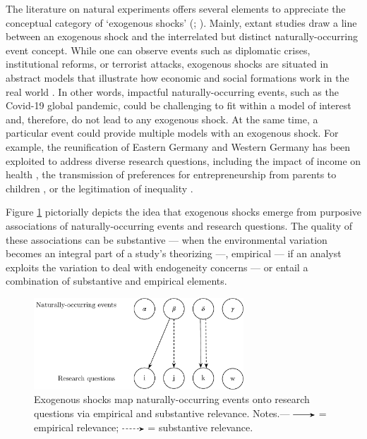 \begin{refsection}
\noindent The literature on natural experiments offers several elements to
appreciate the conceptual category of `exogenous shocks' (\cite[for an overview
of the natural experiment design, see for example][]{withers_li_2021,
dunning_2012,craig_et_al_2017,keele_et_al_2016}; \cite[for a review of the
application of this design, see][]{sekhon_titiunik_2012,sieweke_santoni_2020,
roseinzweig_et_al_2000}). Mainly, extant studies draw a line between an
exogenous shock and the interrelated but distinct naturally-occurring event
concept. While one can observe events such as diplomatic crises, institutional
reforms, or terrorist attacks, exogenous shocks are situated in abstract models
that illustrate how economic and social formations work in the real world
\autocite{morgan_2012}. In other words, impactful naturally-occurring events,
such as the Covid-19 global pandemic, could be challenging to fit within a model
of interest and, therefore, do not lead to any exogenous shock. At the same
time, a particular event could provide multiple models with an exogenous shock.
For example, the reunification of Eastern Germany and Western Germany has been
exploited to address diverse research questions, including the impact of income
on health \autocite[e.g.,][]{frijters_et_al_2004}, the transmission of
preferences for entrepreneurship from parents to children
\autocite[e.g.,][]{wyrwich_2015}, or the legitimation of inequality
\autocite[e.g.,][]{haack_sieweke_2018}.

Figure \ref{fig:event_rq_mapping} pictorially depicts the idea that exogenous 
shocks emerge from purposive associations of naturally-occurring events
and research questions. The quality of these associations can be substantive 
--- when the environmental variation becomes an integral part of a study's 
theorizing ---, empirical --- if an analyst exploits the variation to deal with
endogeneity concerns --- or entail a combination of substantive and
empirical elements.

\begin{figure}[!htbp]
  \centering
  \includegraphics[width=0.7\textwidth]{exhibits/event_rq_mapping.pdf}
  \caption{Exogenous shocks map naturally-occurring events onto 
  research questions via empirical and substantive relevance. Notes.---
  \includegraphics[width=0.075\textwidth]{exhibits/event_rq_mapping_0.pdf}
  = empirical relevance; 
  \includegraphics[width=0.075\textwidth]{exhibits/event_rq_mapping_1.pdf}
   = substantive relevance.}
  \label{fig:event_rq_mapping}
\end{figure}


\end{refsection}
